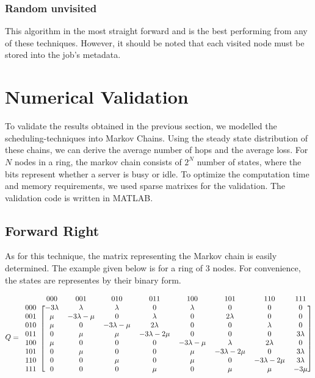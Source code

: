 \documentclass[10pt,a4paper,titlepage]{article}
\begin{document}
\subsubsection*{Random unvisited}
This algorithm in the most straight forward and is the best performing from any of these techniques. However, it should be noted that each visited node must be stored into the job's metadata.

\section{Numerical Validation}
\label{secvalidation}
To validate the results obtained in the previous section, we modelled the scheduling-techniques into Markov Chains. Using the steady state distribution of these chains, we can derive the average number of hops and the average loss. For $N$ nodes in a ring, the markov chain consists of $2^N$ number of states, where the bits represent whether a server is busy or idle. To optimize the computation time and memory requirements, we used sparse matrixes for the validation. The validation code is written in MATLAB.

\subsection{Forward Right}
\label{validateright}
As for this technique, the matrix representing the Markov chain is easily determined. The example given below is for a ring of 3 nodes. For convenience, the states are representes by their binary form.

\[ Q =
  \begin{blockarray}{ccccccccc}
    & 000 & 001 & 010 & 011 & 100 & 101 & 110 & 111 \\
    \begin{block}{c[cccccccc]}
    000 & -3 \lambda & \lambda & \lambda & 0 & \lambda & 0 & 0 & 0 \\
    001 & \mu & -3\lambda-\mu & 0 & \lambda & 0 & 2\lambda & 0 & 0 \\
    010 & \mu & 0 & -3\lambda-\mu & 2\lambda & 0 & 0 & \lambda & 0 \\
    011 & 0 & \mu & \mu & -3\lambda-2\mu & 0 & 0 & 0 & 3\lambda \\
    100 & \mu & 0 & 0 & 0 & -3\lambda-\mu & \lambda & 2\lambda & 0 \\
    101 & 0 & \mu & 0 & 0 & \mu & -3\lambda-2\mu & 0 & 3\lambda \\
    110 & 0 & 0 & \mu & 0 & \mu & 0 & -3\lambda-2\mu & 3\lambda \\
    111 & 0 & 0 & 0 & \mu & 0 & \mu & \mu & -3\mu \\
    \end{block}
  \end{blockarray}
\]
\end{document}
